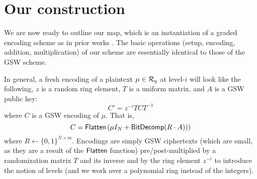 \section{Our construction}

We are now ready to outline our map, which is an instantiation of a graded encoding scheme as in prior works \cite{clt, ggh13a, clt15}.  The basic operations (setup, encoding, addition, multiplication) of our scheme are essentially identical to those of the GSW scheme.

In general, a fresh encoding of a plaintext $\mu \in \mathcal{R}_q$ at level-$i$ will look like the following, $z$ is a random ring element, $T$ is a uniform matrix, and $A$ is a GSW public key:
$$C' = z^{-i}T C T^{-1}$$
where $C$ is a GSW encoding of $\mu$.  That is, $$C = \mathsf{Flatten}\left(\mu I_{N} + \mathsf{BitDecomp}(R\cdot A))\right)$$ where $R \leftarrow \{0,1\}^{N\times m}$. Encodings are simply GSW ciphertexts (which are small, as they are a result of the $\mathsf{Flatten}$ function) pre/post-multiplied by a randomization matrix $T$ and its inverse and by the ring element $z^{-i}$ to introduce the notion of levels (and we work over a polynomial ring instead of the integers).

